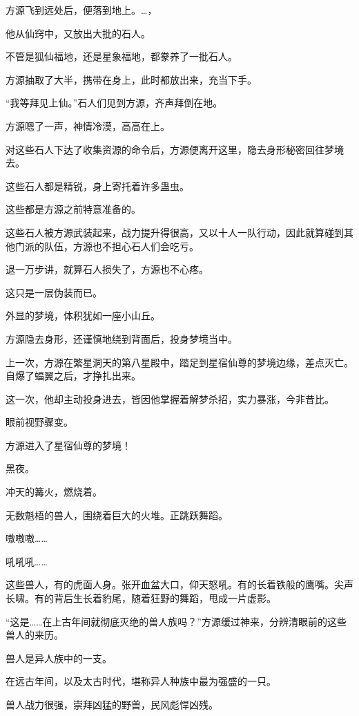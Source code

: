 
\begin{this_body}

方源飞到远处后，便落到地上。…，

他从仙窍中，又放出大批的石人。

不管是狐仙福地，还是星象福地，都豢养了一批石人。

方源抽取了大半，携带在身上，此时都放出来，充当下手。

“我等拜见上仙。”石人们见到方源，齐声拜倒在地。

方源嗯了一声，神情冷漠，高高在上。

对这些石人下达了收集资源的命令后，方源便离开这里，隐去身形秘密回往梦境去。

这些石人都是精锐，身上寄托着许多蛊虫。

这些都是方源之前特意准备的。

这些石人被方源武装起来，战力提升得很高，又以十人一队行动，因此就算碰到其他门派的队伍，方源也不担心石人们会吃亏。

退一万步讲，就算石人损失了，方源也不心疼。

这只是一层伪装而已。

外显的梦境，体积犹如一座小山丘。

方源隐去身形，还谨慎地绕到背面后，投身梦境当中。

上一次，方源在繁星洞天的第八星殿中，踏足到星宿仙尊的梦境边缘，差点灭亡。自爆了蝠翼之后，才挣扎出来。

这一次，他却主动投身进去，皆因他掌握着解梦杀招，实力暴涨，今非昔比。

眼前视野骤变。

方源进入了星宿仙尊的梦境！

黑夜。

冲天的篝火，燃烧着。

无数魁梧的兽人，围绕着巨大的火堆。正跳跃舞蹈。

嗷嗷嗷……

吼吼吼……

这些兽人，有的虎面人身。张开血盆大口，仰天怒吼。有的长着铁般的鹰嘴。尖声长啸。有的背后生长着豹尾，随着狂野的舞蹈，甩成一片虚影。

“这是……在上古年间就彻底灭绝的兽人族吗？”方源缓过神来，分辨清眼前的这些兽人的来历。

兽人是异人族中的一支。

在远古年间，以及太古时代，堪称异人种族中最为强盛的一只。

兽人战力很强，崇拜凶猛的野兽，民风彪悍凶残。


\end{this_body}
